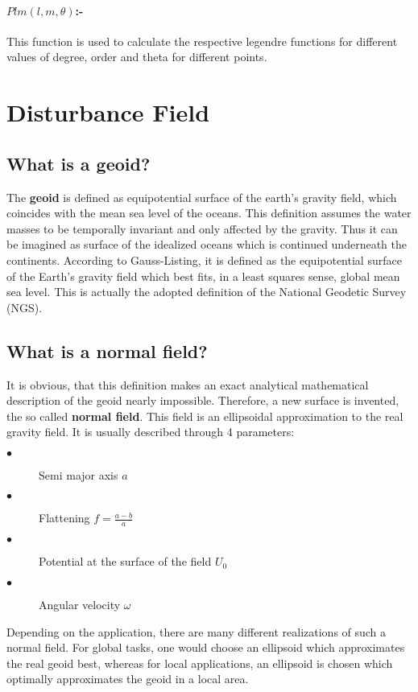 \documentclass[a4paper,12pt]{article}
\begin{document}
\paragraph{$Plm(l,m,\theta)$:-} This function is used to calculate the respective legendre functions for different values of degree, order and theta for different points.





\section{Disturbance Field}
\subsection{What is a  geoid?}
The \textbf{geoid} is defined as equipotential surface of the earth’s gravity field, which coincides with the mean sea level of the oceans. This definition assumes the water masses to be temporally invariant and only affected by the gravity. Thus it can be imagined as surface of the idealized oceans which is continued underneath the continents. According to Gauss-Listing, it is defined as the equipotential surface of the Earth’s gravity field which best fits, in a least squares sense, global mean sea level. This is actually the adopted definition of the National Geodetic Survey (NGS).\\

\subsection{What is a normal field?}
It is obvious, that this definition makes an exact analytical mathematical description of the geoid nearly impossible. Therefore, a new surface is invented, the so called \textbf{normal field}. This field is an ellipsoidal approximation to the real gravity field. It is usually described through 4 parameters:
\begin{description}
\item[$\bullet$]Semi major axis $a$
\item[$\bullet$]Flattening $f=\frac{a-b}{a}$
\item[$\bullet$]Potential at the surface of the field $U_0$
\item[$\bullet$]Angular velocity $\omega$
\end{description}
Depending on the application, there are many different realizations of such a normal field. For global tasks, one would choose an ellipsoid which approximates the real geoid
best, whereas for local applications, an ellipsoid is chosen which optimally approximates the geoid in a local area.\\
\end{document}
